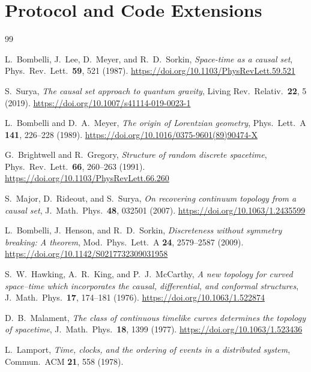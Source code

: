 \documentclass[11pt]{article}
\theoremstyle{remark}
\theoremstyle{plain}
\begin{document}


\section{Protocol and Code Extensions}\label{app:bft-qecc}


\begin{thebibliography}{99}

L.~Bombelli, J.~Lee, D.~Meyer, and R.~D.~Sorkin,
\emph{Space-time as a causal set},
Phys.\ Rev.\ Lett.\ \textbf{59}, 521 (1987).
\url{https://doi.org/10.1103/PhysRevLett.59.521}

S.~Surya,
\emph{The causal set approach to quantum gravity},
Living Rev.\ Relativ.\ \textbf{22}, 5 (2019).
\url{https://doi.org/10.1007/s41114-019-0023-1}

L.~Bombelli and D.~A.~Meyer,
\emph{The origin of Lorentzian geometry},
Phys.\ Lett.\ A \textbf{141}, 226--228 (1989).
\url{https://doi.org/10.1016/0375-9601(89)90474-X}

G.~Brightwell and R.~Gregory,
\emph{Structure of random discrete spacetime},
Phys.\ Rev.\ Lett.\ \textbf{66}, 260--263 (1991).
\url{https://doi.org/10.1103/PhysRevLett.66.260}

S.~Major, D.~Rideout, and S.~Surya,
\emph{On recovering continuum topology from a causal set},
J.\ Math.\ Phys.\ \textbf{48}, 032501 (2007).
\url{https://doi.org/10.1063/1.2435599}

L.~Bombelli, J.~Henson, and R.~D.~Sorkin,
\emph{Discreteness without symmetry breaking: A theorem},
Mod.\ Phys.\ Lett.\ A \textbf{24}, 2579--2587 (2009).
\url{https://doi.org/10.1142/S0217732309031958}

S.~W.~Hawking, A.~R.~King, and P.~J.~McCarthy,
\emph{A new topology for curved space--time which incorporates the causal,
differential, and conformal structures},
J.\ Math.\ Phys.\ \textbf{17}, 174--181 (1976).
\url{https://doi.org/10.1063/1.522874}

D.~B.~Malament,
\emph{The class of continuous timelike curves determines the topology of spacetime},
J.\ Math.\ Phys.\ \textbf{18}, 1399 (1977).
\url{https://doi.org/10.1063/1.523436}

L.~Lamport,
\emph{Time, clocks, and the ordering of events in a distributed system},
Commun.\ ACM \textbf{21}, 558 (1978).


\end{thebibliography}
\end{document}
